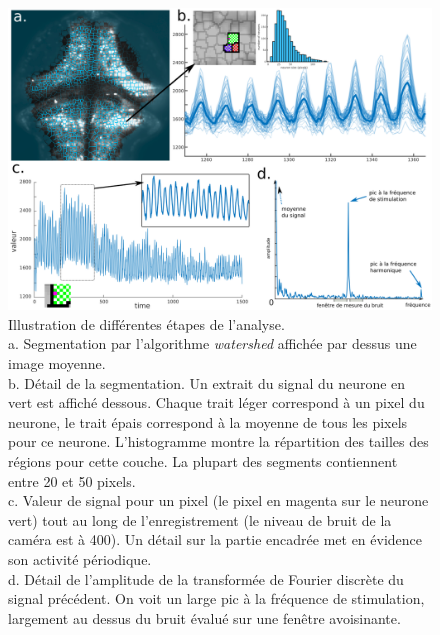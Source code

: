 \begin{figure}
\centering
\includegraphics[width=1\textwidth]{./files/analysis_illustration.svg.png}
\caption{Illustration de différentes étapes de l'analyse.
\\a. Segmentation par l'algorithme \emph{watershed} affichée par dessus une image moyenne.
\\b. Détail de la segmentation. Un extrait du signal du neurone en vert est affiché dessous. Chaque trait léger correspond à un pixel du neurone, le trait épais correspond à la moyenne de tous les pixels pour ce neurone. L'histogramme montre la répartition des tailles des régions pour cette couche. La plupart des segments contiennent entre 20 et 50 pixels.
\\c. Valeur de signal pour un pixel (le pixel en magenta sur le neurone vert) tout au long de l'enregistrement (le niveau de bruit de la caméra est à 400). Un détail sur la partie encadrée met en évidence son activité périodique.
\\d. Détail de l'amplitude de la transformée de Fourier discrète du signal précédent. On voit un large pic à la fréquence de stimulation, largement au dessus du bruit évalué sur une fenêtre avoisinante.
\label{FIGfourier}}
\end{figure}    


